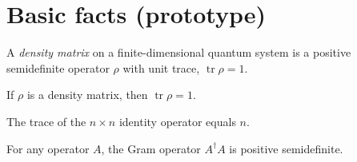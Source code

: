 
\section{Basic facts (prototype)}

\begin{definition}
  \label{def:density}
  A \emph{density matrix} on a finite-dimensional quantum system is a positive
  semidefinite operator $\rho$ with unit trace, $\operatorname{tr}\rho = 1$.
\end{definition}

\begin{proposition}
  \label{prop:density-trace}
  If $\rho$ is a density matrix, then $\operatorname{tr}\rho = 1$.
\end{proposition}

\begin{theorem}
  \label{thm:trace-one}
  The trace of the $n \times n$ identity operator equals $n$.
\end{theorem}

\begin{theorem}
  \label{thm:gram-psd}
  For any operator $A$, the Gram operator $A^{\dagger} A$ is positive
  semidefinite.
\end{theorem}

